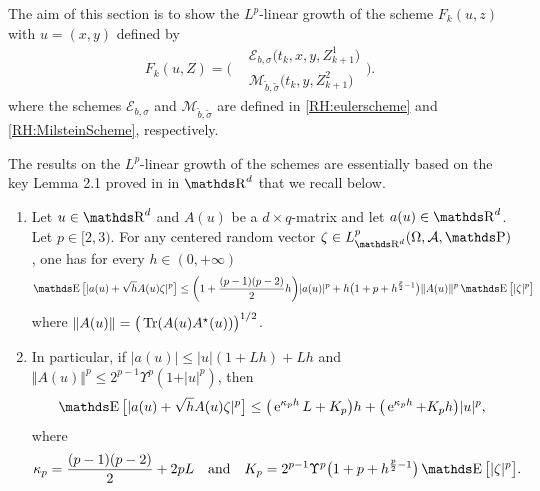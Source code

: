 The aim of this section is to show the $L^p$-linear growth of the scheme $F_k(u,z)$ with $u = (x,y)$ defined by
\begin{equation}\label{RH:scheme_couple}
	F_k(u, Z) = \Bigg(
	\begin{aligned}
			 & \mathcal{E}_{b, \sigma} \big( t_k, x, y, Z_{k+1}^1 \big)                    \\
			 & \mathcal{M}_{\widetilde b, \widetilde \sigma} \big( t_k, y, Z_{k+1}^2 \big)
		\end{aligned} \Bigg).
\end{equation}
where the schemes $\mathcal{E}_{b, \sigma}$ and $\mathcal{M}_{\widetilde b, \widetilde \sigma}$ are defined in \eqref{RH:eulerscheme} and \eqref{RH:MilsteinScheme}, respectively.

The results on the $L^p$-linear growth of the schemes are essentially based on the key Lemma 2.1 proved in \cite{sagna2018general} in $\R^d$ that we recall below.

\begin{lemme}\label{RH:key_lemma}
	\begin{enumerate}[label=(\alph*)]
		\item Let $u \in \R^d$ and $A(u)$ be a $d \times q$-matrix and let $a(u) \in \R^d$. Let $p \in [2,3)$. For any centered random vector $\zeta \in L^p_{\R^d}(\Omega, \A, \Prob)$, one has for every $h \in (0, + \infty)$
		      \begin{equation}
			      \E \big[ \vert a(u) + \sqrt{h} A(u) \zeta \vert^p \big] \leq \bigg( 1 + \frac{(p-1)(p-2)}{2} h \bigg) \vert a(u) \vert^p + h \big( 1 + p + h^{\frac{p}{2}-1} \big) \Vert A(u) \Vert^p \E \big[ \vert \zeta \vert^p \big]
		      \end{equation}
		      where $\Vert A(u) \Vert = \big( \operatorname{Tr}(A(u) A^{\star}(u)) \big)^{1/2}$.
		\item In particular, if $\vert a(u) \vert \leq \vert u \vert ( 1 + L h) +  Lh$ and $\Vert A(u) \Vert^p \leq 2^{p-1} \Upsilon^p (1 + \vert u \vert^p)$, then
		      \begin{equation}
			      \E \big[ \vert a(u) + \sqrt{h} A(u) \zeta \vert^p \big] \leq \big( \e^{\kappa_p h} L + K_p \big) h + \big( \e^{\kappa_p h} + K_p h \big) \vert u \vert^p,
		      \end{equation}
		      where
		      \begin{equation}
			      \kappa_p = \frac{(p-1)(p-2)}{2} + 2 p L \quad \mbox{and} \quad K_p = 2^{p-1} \Upsilon^p \big( 1 + p + h^{\frac{p}{2}-1} \big) \E \big[ \vert \zeta \vert^p \big].
		      \end{equation}
	\end{enumerate}
\end{lemme}

